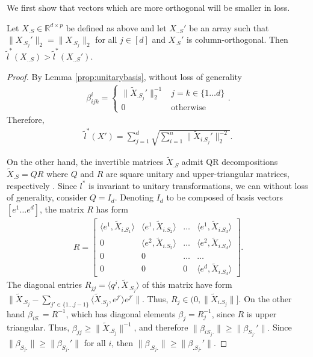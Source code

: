 \documentclass[a4paper,11pt]{article}
\begin{document}
We first show that vectors which are more orthogonal will be smaller in loss.

\begin{proposition}
\label{lemma:orthogonal}
Let $X_{.S} \in \mathbb R^{d \times p}$ be defined as above and let $X_{..S}'$ be an array such that $\|X_{.S_j}'\|_2 = \|X_{.S_j}\|_2$ for all $j \in [d]$ and $X_{.S}'$ is column-orthogonal.
Then $\tilde l^* (X_{..S}) > \tilde l^* (X_{..S}')$.
\end{proposition}
\begin{proof}

By Lemma \ref{prop:unitarybasis}, without loss of generality
\begin{eqnarray}
\beta_{ijk}^i = \begin{cases} \|\tilde X_{.S_j}'\|_2^{-1} & j = k \in \{ 1 \dots d\}  \\
0 & \text{otherwise}
\end{cases}.
\end{eqnarray}
Therefore,
\begin{eqnarray}
\tilde l^*(X') = \sum_{j = 1}^d \sqrt{\sum_{i = 1}^n \|\tilde X_{i.S_j}' \|_2^{-2}}.
\end{eqnarray}

On the other hand, the invertible matrices $\tilde X_{.S}$ admit QR decompositions $\tilde X_{.S} = QR$ where $Q$ and $R$ are square unitary and upper-triangular matrices, respectively \cite{Anderson1992-fb}.
Since $l^*$ is invariant to unitary transformations, we can without loss of generality, consider $Q= I_d$.
Denoting $I_d$ to be composed of basis vectors $[e^1 \dots e^d]$, the matrix $R$ has form
\begin{eqnarray}
R = \begin{bmatrix}
\langle e^1, \tilde X_{i.{S_1}} \rangle & \langle e^1, \tilde X_{i.{S_2}} \rangle  &\dots &  \langle e^1, \tilde X_{i.{S_d}} \rangle \\
0 & \langle e^2, \tilde X_{i.{S_2}} \rangle & \dots  &  \langle e^2, \tilde X_{i.{S_d}} \rangle\\
0 & 0 & \dots & \dots  \\
0 & 0 & 0& \langle e^d, \tilde X_{i.{S_d}} \rangle 
\end{bmatrix}.
\end{eqnarray}
The diagonal entries $R_{jj} = \langle q^j, \tilde X_{.{S_j}} \rangle$ of this matrix have form $\| \tilde X_{.{S_j}} -  \sum_{j' \in \{1 \dots j-1\}} \langle \tilde X_{.{S_{j}}}, e^{j'} \rangle e^{j'} \|$.
Thus, $R_{j} \in (0, \| \tilde X_{i.{S_j}}\|]$.
On the other hand $\beta_{iS.} =R^{-1}$, which has diagonal elements $\beta_{j} = R_{j}^{-1}$, since $R$ is upper triangular.
Thus, $\beta_{jj} \geq \| \tilde X_{.{S_j}}\|^{-1}$, and therefore $\|\beta_{iS_j.}\| \geq \|\beta_{S_j.}'\|.$
Since $\|\beta_{S_j.}\| \geq \|\beta_{S_j.}'\|$ for all $i$, then $\|\beta_{.S_j.}\| \geq \|\beta_{.S_j.}' \|$.
\end{proof}
\end{document}
